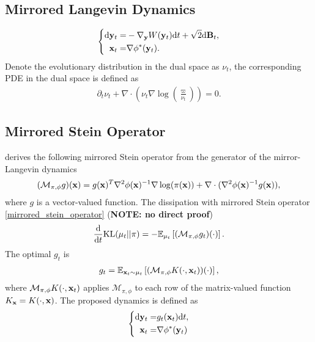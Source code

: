 \subsection{Mirrored Langevin Dynamics}
\cite{hsieh2018mirrored}
\begin{align}\label{mirrored_ld}
	\left\{
		\begin{aligned}
			\mathrm{d} \mathbf{y}_t = & -\nabla_{\mathbf{y}} W(\mathbf{y}_t)\mathrm{d} t + \sqrt{2}\mathrm{d} \mathbf{B}_t, \\
			\mathbf{x}_t = & \nabla\phi^*(\mathbf{y}_t).
		\end{aligned}
	\right.
\end{align}
Denote the evolutionary distribution in the dual space as $\nu_t$, the corresponding PDE in the dual space is defined as
\begin{align}
	\partial_t \nu_t + \nabla\cdot (\nu_t \nabla\log(\frac{\varpi}{\nu_t})) = 0.
\end{align}

\subsection{Mirrored Stein Operator}
\cite{shi2021sampling} derives the following mirrored Stein operator from the generator of the mirror-Langevin dynamics 
\begin{align}\label{mirrored_stein_operator}
	(\mathcal{M}_{\pi,\phi}g)(\mathbf{x}) = g(\mathbf{x})^T\nabla^2\phi(\mathbf{x})^{-1}\nabla\log(\pi(\mathbf{x})) + \nabla\cdot(\nabla^2\phi(\mathbf{x})^{-1}g(\mathbf{x})), 
\end{align}
where $g$ is a vector-valued function.
The dissipation with mirrored Stein operator \eqref{mirrored_stein_operator} ({\bfseries NOTE: no direct proof})
\begin{align}
	\frac{\mathrm{d}}{\mathrm{d} t}\text{KL}(\mu_t||\pi) = -\mathbb{E}_{\mu_t}\left[(\mathcal{M}_{\pi,\phi}g_t)(\cdot)\right].
\end{align}
The optimal $g_t$ is 
\begin{align}
	g_t = \mathbb{E}_{\mathbf{x}_t\sim\mu_t}\left[(\mathcal{M}_{\pi,\phi}K(\cdot, \mathbf{x}_t))(\cdot)\right], 
\end{align}
where $\mathcal{M}_{\pi,\phi}K(\cdot, \mathbf{x}_t)$ applies $\mathcal{M}_{\pi,\phi}$ to each row of the matrix-valued function $K_{\mathbf{x}} = K(\cdot, \mathbf{x})$.
The proposed dynamics is defined as 
\begin{align}
	\left\{
		\begin{aligned}
			\mathrm{d} \mathbf{y}_t = &g_t(\mathbf{x}_t)\mathrm{d} t, \\
			\mathbf{x}_t = & \nabla\phi^*(\mathbf{y}_t)
		\end{aligned}
	\right.
\end{align}

